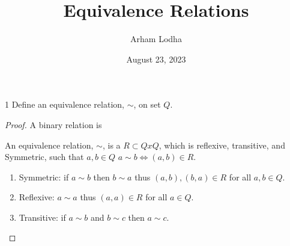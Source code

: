 \documentclass{article}
\newcommand{\Q}{\mathbb{Q}}
\newcommand{\Z}{\mathbb{Z}}
\begin{document}
\title{Equivalence Relations}
\author{Arham Lodha}%
\date{August 23, 2023}%
\maketitle

\begin{QU}{1}\label{Question 1}
	Define an equivalence relation, $\sim$, on set $Q$.
\end{QU}
\begin{proof}

	A binary relation is

	An equivalence relation, $\sim$, is a $R \subset Q x Q$, which is reflexive, transitive, and Symmetric, such that $a, b \in Q$ $a\sim b \iff (a,b) \in R$.

	\begin{enumerate}
		\item Symmetric: if $a \sim b$ then $b \sim a$ thus $(a, b), (b, a) \in R$ for all $a, b \in Q$.
		\item Reflexive: $a \sim a$ thus $(a,a) \in R$ for all $a \in Q$.
		\item Transitive: if $a \sim b$ and $b \sim c$ then $a \sim c$.
	\end{enumerate}





\end{proof}
\end{document}
